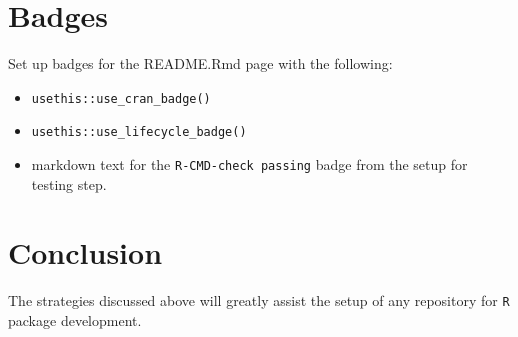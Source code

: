 \documentclass{article}
\begin{document}
\section{Badges}
\label{sec:badges}

Set up badges for the README.Rmd page with the following:

\begin{itemize}
	
  \item \verb|usethis::use_cran_badge()|

  \item \verb|usethis::use_lifecycle_badge()|
  
  \item markdown text for the \verb|R-CMD-check passing| badge from the setup for testing step.

\end{itemize}


\section{Conclusion} 
\label{sec:conclusion}

The strategies discussed above will greatly assist the setup of any repository 
for \texttt{R} package development.




% 
\end{document}
